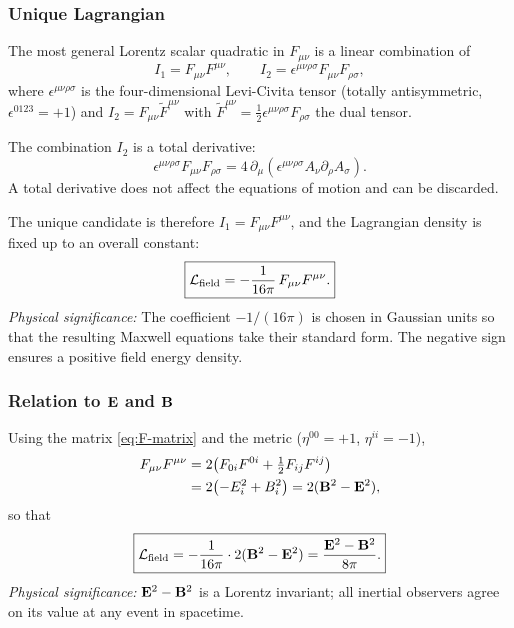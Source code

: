\subsubsection*{Unique Lagrangian}

The most general Lorentz scalar quadratic in $F_{\mu\nu}$ is a linear combination of
\begin{equation}
  I_1 = F_{\mu\nu}F^{\mu\nu}, \qquad
  I_2 = \epsilon^{\mu\nu\rho\sigma}F_{\mu\nu}F_{\rho\sigma},
\end{equation}
where $\epsilon^{\mu\nu\rho\sigma}$ is the four-dimensional Levi-Civita tensor (totally antisymmetric, $\epsilon^{0123} = +1$) and $I_2 = F_{\mu\nu}\widetilde{F}^{\mu\nu}$ with $\widetilde{F}^{\mu\nu} = \tfrac{1}{2}\epsilon^{\mu\nu\rho\sigma}F_{\rho\sigma}$ the dual tensor.

The combination $I_2$ is a total derivative:
\[
  \epsilon^{\mu\nu\rho\sigma}F_{\mu\nu}F_{\rho\sigma} = 4\,\partial_\mu\!\left(\epsilon^{\mu\nu\rho\sigma}A_\nu\partial_\rho A_\sigma\right).
\]
A total derivative does not affect the equations of motion and can be discarded.

The unique candidate is therefore $I_1 = F_{\mu\nu}F^{\mu\nu}$, and the Lagrangian density is fixed up to an overall constant:
\begin{equation}\label{eq:Lem}
  \boxed{\mathcal{L}_{\rm field} = -\frac{1}{16\pi}\,F_{\mu\nu}F^{\mu\nu}.}
\end{equation}
\textit{Physical significance:} The coefficient $-1/(16\pi)$ is chosen in Gaussian units so that the resulting Maxwell equations take their standard form.  The negative sign ensures a positive field energy density.

\subsubsection*{Relation to $\mathbf{E}$ and $\mathbf{B}$}

Using the matrix \eqref{eq:F-matrix} and the metric ($\eta^{00}=+1$, $\eta^{ii}=-1$),
\begin{align}
  F_{\mu\nu}F^{\mu\nu}
  &= 2\bigl(F_{0i}F^{0i} + \tfrac{1}{2}F_{ij}F^{ij}\bigr) \notag\\
  &= 2\bigl(-E_i^2 + B_i^2\bigr) = 2(\mathbf{B}^2 - \mathbf{E}^2),
\end{align}
so that
\begin{equation}\label{eq:Lem-EB}
  \boxed{\mathcal{L}_{\rm field}
  = -\frac{1}{16\pi}\cdot 2(\mathbf{B}^2-\mathbf{E}^2)
  = \frac{\mathbf{E}^2-\mathbf{B}^2}{8\pi}.}
\end{equation}
\textit{Physical significance:} $\mathbf{E}^2 - \mathbf{B}^2$ is a Lorentz invariant; all inertial observers agree on its value at any event in spacetime.

